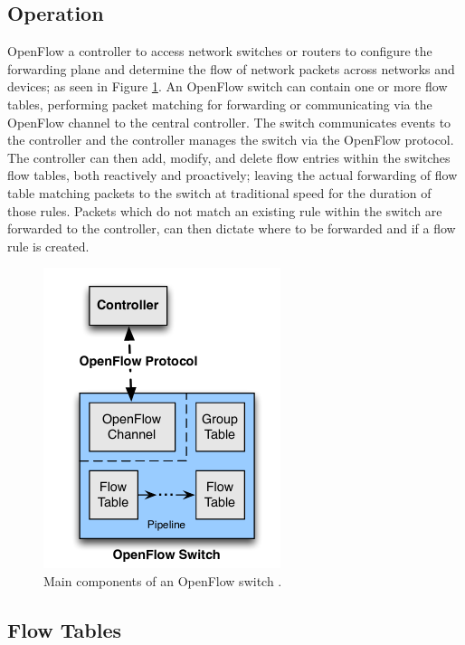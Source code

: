 \documentclass[12pt, oneside]{book}
\begin{document}
\subsection{Operation} %
OpenFlow a controller to access network switches or routers
to configure the forwarding plane and determine the flow of
network packets across networks and devices; as seen in Figure \ref{fig:openflowSwitch}.
An OpenFlow switch can contain one or more flow tables, performing 
packet matching for forwarding or communicating via the OpenFlow channel to the central controller. 
The switch communicates events to the controller and the controller manages the switch via the OpenFlow protocol.
The controller can then add, modify, and delete flow entries within the switches flow tables, both reactively
and proactively; leaving the actual forwarding of flow table matching packets to the switch at traditional speed for the duration
of those rules. Packets which do not match an existing rule within the switch are forwarded to the controller, can
then dictate where to be forwarded and if a flow rule is created. 

\begin{figure}[H]
	\centering
	\includegraphics[scale=0.6]{images/openflow13.png}
	\caption{Main components of an OpenFlow switch \cite{openflow}.}
	\label{fig:openflowSwitch}
\end{figure}

\subsection{Flow Tables}%
\end{document}
